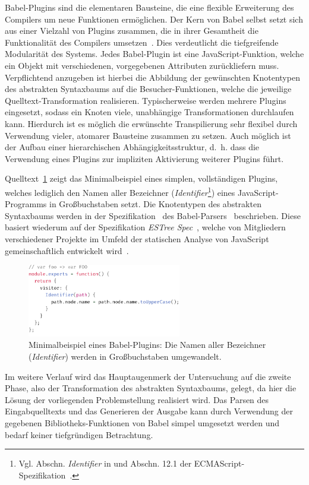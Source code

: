 Babel-Plugins sind die elementaren Bausteine, die eine flexible Erweiterung des Compilers um neue Funktionen ermöglichen. Der Kern von Babel selbst setzt sich aus einer Vielzahl von Plugins zusammen, die in ihrer Gesamtheit die Funktionalität des Compilers umsetzen~\autocite{BABEL}. Dies verdeutlicht die tiefgreifende Modularität des Systems. Jedes Babel-Plugin ist eine JavaScript-Funktion, welche ein Objekt mit verschiedenen, vorgegebenen Attributen zurückliefern muss. Verpflichtend anzugeben ist hierbei die Abbildung der gewünschten Knotentypen des abstrakten Syntaxbaums auf die Besucher-Funktionen, welche die jeweilige Quelltext-Transformation realisieren. Typischerweise werden mehrere Plugins eingesetzt, sodass ein Knoten viele, unabhängige Transformationen durchlaufen kann. Hierdurch ist es möglich die erwünschte Transpilierung sehr flexibel durch Verwendung vieler, atomarer Bausteine zusammen zu setzen. Auch möglich ist der Aufbau einer hierarchischen Abhängigkeitsstruktur, d.~h. dass die Verwendung eines Plugins zur impliziten Aktivierung weiterer Plugins führt.

Quelltext~\ref{code:babel-plugin-definition} zeigt das Minimalbeispiel eines simplen, vollständigen Plugins, welches lediglich den Namen aller Bezeichner (\textit{Identifier}\footnote{Vgl. Abschn. \textit{Identifier} in \autocite{BABEL:PARSER_SPEC} und Abschn. 12.1 der ECMAScript-Spezifikation~\autocite[187\psqq]{ECMASCRIPT:2019}.}) eines JavaScript-Programms in Großbuchstaben setzt. Die Knotentypen des abstrakten Syntaxbaums werden in der Spezifikation~\autocite{BABEL:PARSER_SPEC} des Babel-Parsers~\autocite{BABEL:PARSER} beschrieben. Diese basiert wiederum auf der Spezifikation \textit{ESTree Spec}~\autocite{ESTREE_SPEC}, welche von Mitgliedern verschiedener Projekte im Umfeld der statischen Analyse von JavaScript gemeinschaftlich entwickelt wird~\autocite{BABEL:PARSER,ESTREE_SPEC}.

\medskip
\begin{figure}[htbp]
  \includegraphics[width=0.6\textwidth]{src/2_Grundlagen/fig/minimal-babel-plugin.pdf}
  \caption[Minimalbeispiel eines Babel-Plugins]{Minimalbeispiel eines Babel-Plugins: Die Namen aller Bezeichner (\textit{Identifier}) werden in Großbuchstaben umgewandelt.}
  \label{code:babel-plugin-definition}
\end{figure}


Im weitere Verlauf wird das Hauptaugenmerk der Untersuchung auf die zweite Phase, also der Transformation des abstrakten Syntaxbaums, gelegt, da hier die Lösung der vorliegenden Problemstellung realisiert wird. Das Parsen des Eingabquelltexts und das Generieren der Ausgabe kann durch Verwendung der gegebenen Bibliotheks-Funktionen von Babel simpel umgesetzt werden und bedarf keiner tiefgründigen Betrachtung.
